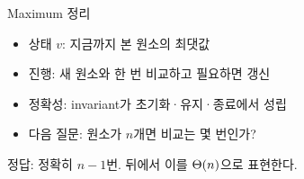 \begin{frame}{Maximum 정리}
  \begin{takeaway}
    \begin{itemize}
      \item 상태 $v$: 지금까지 본 원소의 최댓값
      \item 진행: 새 원소와 한 번 비교하고 필요하면 갱신
      \item 정확성: invariant가 초기화·유지·종료에서 성립
      \item 다음 질문: 원소가 $n$개면 비교는 몇 번인가?
    \end{itemize}
  \end{takeaway}
  정답: 정확히 $n-1$번. 뒤에서 이를 $\Theta(n)$으로 표현한다.\par
\end{frame}
